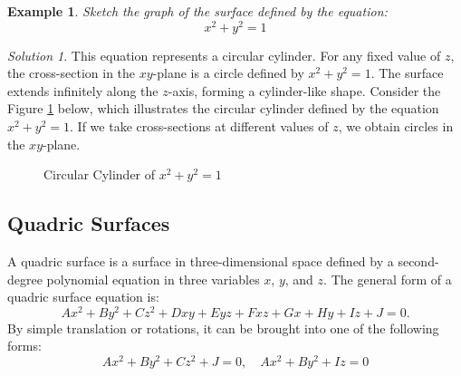 \documentclass{book}
\newtheorem{example}{Example}[chapter]
\theoremstyle{remark}
\newtheorem*{solution}{Solution}
\begin{document}
\begin{example}
    Sketch the graph of the surface defined by the equation:
    \[
        x^2 + y^2 = 1
    \]
\end{example}
\begin{solution}
    This equation represents a circular cylinder. For any fixed value of $z$, the cross-section in the $xy$-plane is a circle defined by $x^2 + y^2 = 1$. The surface extends infinitely along the $z$-axis, forming a cylinder-like shape. Consider the Figure \ref{fig:circular_cylinder} below, which illustrates the circular cylinder defined by the equation $x^2 + y^2 = 1$. If we take cross-sections at different values of $z$, we obtain circles in the $xy$-plane.
\end{solution}

\begin{figure}[ht]
    \centering
    \caption{Circular Cylinder of $x^2 + y^2 = 1$}\label{fig:circular_cylinder}
\end{figure}

\subsection{Quadric Surfaces}
A quadric surface is a surface in three-dimensional space defined by a second-degree polynomial equation in three variables $x$, $y$, and $z$. The general form of a quadric surface equation is:
\[
    Ax^2 + By^2 + Cz^2 + Dxy + Eyz + Fxz + Gx + Hy + Iz + J = 0.
\]
By simple translation or rotations, it can be brought into one of the following forms:
\[
    Ax^2 + By^2 + Cz^2 + J = 0, \quad Ax^2 + By^2 + Iz = 0
\]
\end{document}
